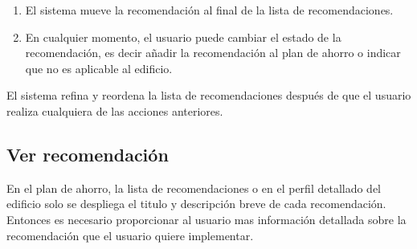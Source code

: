 \begin{usecase}
{\begin{itemize}
      \begin{enumerate}
      \item El sistema mueve la recomendación al final de la lista de
        recomendaciones.
      \item En cualquier momento, el usuario puede cambiar el estado de la
        recomendación, es decir añadir la recomendación al plan de ahorro
        o indicar que no es aplicable al edificio.
      \end{enumerate}
    \end{itemize}
  \item El sistema refina y reordena la lista de recomendaciones después de que
    el usuario realiza cualquiera de las acciones anteriores.
  }
\end{usecase}

\subsection{Ver recomendación}

En el plan de ahorro, la lista de recomendaciones o en el perfil detallado
del edificio solo se despliega el titulo y descripción breve de cada
recomendación. Entonces es necesario proporcionar al usuario mas información
detallada sobre la recomendación que el usuario quiere implementar.

